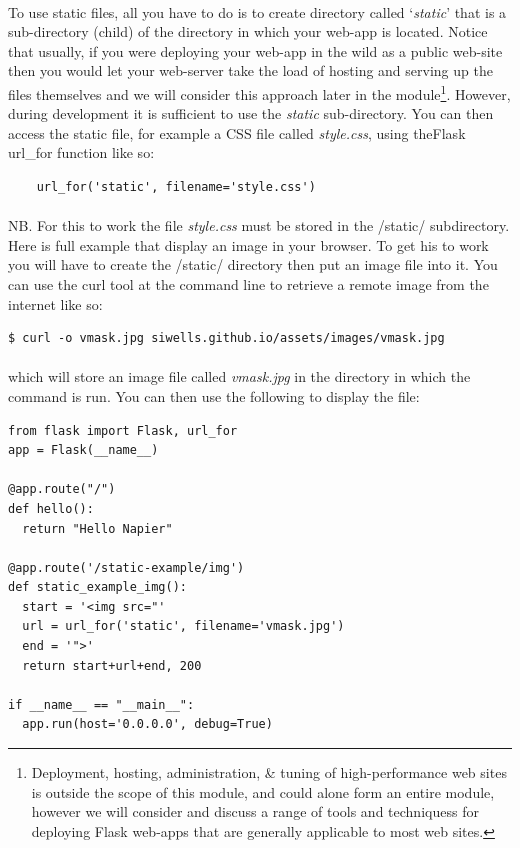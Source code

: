 \documentclass[12pt, a4paper, oneside]{book}
\begin{document}
\paragraph{} To use static files, all you have to do is to create directory called `\emph{static}' that is a sub-directory (child) of the directory in which your web-app is located. Notice that usually, if you were deploying your web-app in the wild as a public web-site then you would let your web-server take the load of hosting and serving up the files themselves and we will consider this approach later in the module\footnote{Deployment, hosting, administration, \& tuning of high-performance web sites is outside the scope of this module, and could alone form an entire module, however we will consider and discuss a range of tools and techniquess for deploying Flask web-apps that are generally applicable to most web sites.}. However, during development it is sufficient to use the \emph{static} sub-directory. You can then access the static file, for example a CSS file called \emph{style.css}, using theFlask url\_for function like so:

\begin{lstlisting}
    url_for('static', filename='style.css')
\end{lstlisting}

\paragraph{} NB. For this to work the file \emph{style.css} must be stored in the /static/ subdirectory. Here is full example that display an image in your browser. To get his to work you will have to create the /static/ directory then put an image file into it. You can use the curl tool at the command line to retrieve a remote image from the internet like so:

\begin{lstlisting}[style=DOS]
    $ curl -o vmask.jpg siwells.github.io/assets/images/vmask.jpg 
\end{lstlisting}

\paragraph{} which will store an image file called \emph{vmask.jpg} in the directory in which the command is run. You can then use the following to display the file:

\begin{lstlisting}
from flask import Flask, url_for
app = Flask(__name__)

@app.route("/")
def hello():
  return "Hello Napier"

@app.route('/static-example/img')
def static_example_img():
  start = '<img src="'
  url = url_for('static', filename='vmask.jpg')
  end = '">'
  return start+url+end, 200

if __name__ == "__main__":
  app.run(host='0.0.0.0', debug=True)
\end{lstlisting}
\end{document}
